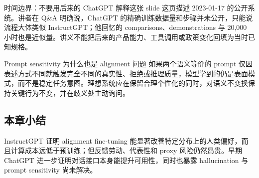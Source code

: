 \begin{warningbox}{时间边界：不要用后来的 ChatGPT 解释这张 slide}
这页描述 2023-01-17 的公开系统。讲者在 Q\&A 明确说，ChatGPT 的精确训练数据量和步骤并未公开，只能说流程大体类似 InstructGPT；他回忆的 comparisons、demonstrations 与 20,000 小时也是近似量。讲义不能把后来的产品能力、工具调用或政策变化回填为当时已知规格。
\end{warningbox}

\begin{importantbox}{Prompt sensitivity 为什么也是 alignment 问题}
如果两个语义等价的 prompt 仅因表述方式不同就触发完全不同的真实性、拒绝或推理质量，模型学到的仍是表面模式，而不是稳定任务意图。理想系统应在保留合理个性化的同时，对语义不变换保持关键行为不变，并在歧义处主动询问。
\end{importantbox}

\subsection{本章小结}

InstructGPT 证明 alignment fine-tuning 能显著改善特定分布上的人类偏好，而且计算成本远低于预训练；但反馈劳动、代表性和 proxy 风险仍然昂贵。早期 ChatGPT 进一步证明对话接口本身能提升可用性，同时也暴露 hallucination 与 prompt sensitivity 尚未解决。

